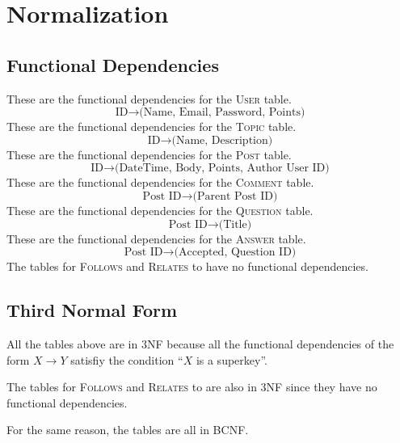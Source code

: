 \section{Normalization}
\subsection{Functional Dependencies}
These are the functional dependencies for the \textsc{User} table.
\[\text{ID} \to \text{(Name, Email, Password, Points)}\]
These are the functional dependencies for the \textsc{Topic} table.
\[\text{ID} \to \text{(Name, Description)}\]
These are the functional dependencies for the \textsc{Post} table.
\[\text{ID} \to \text{(DateTime, Body, Points, Author User ID)}\]
These are the functional dependencies for the \textsc{Comment} table.
\[\text{Post ID} \to \text{(Parent Post ID)}\]
These are the functional dependencies for the \textsc{Question} table.
\[\text{Post ID} \to \text{(Title)}\]
These are the functional dependencies for the \textsc{Answer} table.
\[\text{Post ID} \to \text{(Accepted, Question ID)}\]
The tables for \textsc{Follows} and \textsc{Relates} to have no functional dependencies.


\subsection{Third Normal Form}
All the tables above are in 3NF because all the functional dependencies of the form \(X \to Y\) satisfiy the condition ``\(X\) is a superkey''.

The tables for \textsc{Follows} and \textsc{Relates} to are also in 3NF since they have no functional dependencies.

For the same reason, the tables are all in BCNF.
